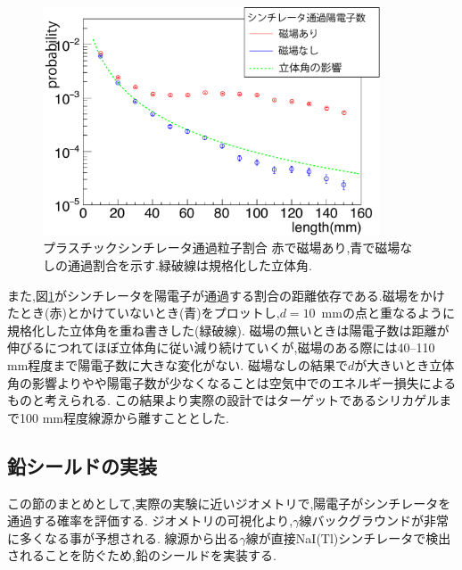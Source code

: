 \begin{figure}[!tbp]
	\centering
		\includegraphics[width=10cm]{fig/scinti_test.pdf}
	\caption[プラスチックシンチレータ通過粒子割合] {プラスチックシンチレータ通過粒子割合 \newline 赤で磁場あり,青で磁場なしの通過割合を示す.緑破線は規格化した立体角.}
	\label{scinti_test}
\end{figure}


また,図\ref{scinti_test}がシンチレータを陽電子が通過する割合の距離依存である.磁場をかけたとき(赤)とかけていないとき(青)をプロットし,$d=10$\, mmの点と重なるように規格化した立体角を重ね書きした(緑破線).
磁場の無いときは陽電子数は距離が伸びるにつれてほぼ立体角に従い減り続けていくが,磁場のある際には40--110 mm程度まで陽電子数に大きな変化がない.
磁場なしの結果で$d$が大きいとき立体角の影響よりやや陽電子数が少なくなることは空気中でのエネルギー損失によるものと考えられる.
この結果より実際の設計ではターゲットであるシリカゲルまで100 mm程度線源から離すこととした.

\subsection{鉛シールドの実装}
この節のまとめとして,実際の実験に近いジオメトリで,陽電子がシンチレータを通過する確率を評価する.
ジオメトリの可視化より,$\gamma$線バックグラウンドが非常に多くなる事が予想される.
線源から出る$\gamma$線が直接NaI(Tl)シンチレータで検出されることを防ぐため,鉛のシールドを実装する.

